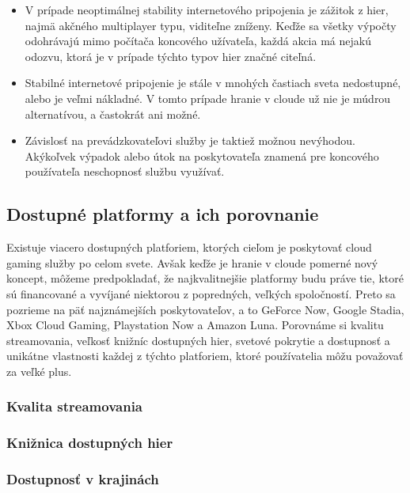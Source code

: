 \documentclass[10pt,twoside,slovak,a4paper]{article}
\begin{document}
\begin{itemize}

\item V prípade neoptimálnej stability internetového pripojenia je zážitok z hier, najmä akčného multiplayer typu, viditeľne zníženy. Keďže sa všetky výpočty odohrávajú mimo počítača koncového užívateľa, každá akcia má nejakú odozvu, ktorá je v prípade týchto typov hier značné citeľná.

\item Stabilné internetové pripojenie je stále v mnohých častiach sveta nedostupné, alebo je veľmi nákladné. V tomto prípade hranie v cloude už nie je múdrou alternatívou, a častokrát ani možné.

\item Závislosť na prevádzkovateľovi služby je taktiež možnou nevýhodou. Akýkoľvek výpadok alebo útok na poskytovateľa znamená pre koncového používateľa neschopnosť službu využívať.

\end{itemize}



\subsection{Dostupné platformy a ich porovnanie}

Existuje viacero dostupných platforiem, ktorých cieľom je poskytovať cloud gaming služby po celom svete. Avšak keďže je hranie v cloude pomerné nový koncept, môžeme predpokladať, že najkvalitnejšie platformy budu práve tie, ktoré sú financované a vyvíjané niektorou z popredných, veľkých spoločností. Preto sa pozrieme na päť najznámejších poskytovateľov, a to GeForce Now, Google Stadia, Xbox Cloud Gaming, Playstation Now a Amazon Luna. Porovnáme si kvalitu streamovania, veľkosť knižníc dostupných hier, svetové pokrytie a dostupnosť a unikátne vlastnosti každej z týchto platforiem, ktoré používatelia môžu považovať za veľké plus.



\subsubsection{Kvalita streamovania}

\subsubsection{Knižnica dostupných hier}

\subsubsection{Dostupnosť v krajinách}
\end{document}
